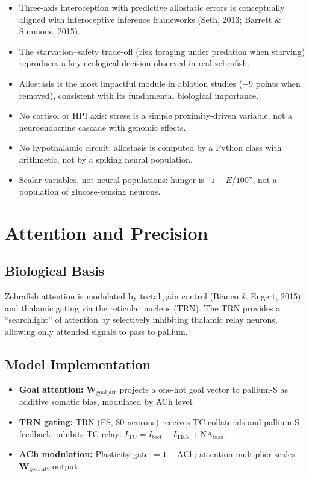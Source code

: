 \documentclass[11pt,a4paper]{article}
\begin{document}
\begin{itemize}[leftmargin=*]
\item[\textcolor{realistic}{$\checkmark$}] Three-axis interoception with predictive
  allostatic errors is conceptually aligned with interoceptive inference frameworks
  (Seth, 2013; Barrett \& Simmons, 2015).
\item[\textcolor{realistic}{$\checkmark$}] The starvation--safety trade-off
  (risk foraging under predation when starving) reproduces a key ecological
  decision observed in real zebrafish.
\item[\textcolor{realistic}{$\checkmark$}] Allostasis is the most impactful module
  in ablation studies ($-9$ points when removed), consistent with its fundamental
  biological importance.
\item[\textcolor{missing}{$\times$}] No cortisol or HPI axis: stress is a simple
  proximity-driven variable, not a neuroendocrine cascade with genomic effects.
\item[\textcolor{missing}{$\times$}] No hypothalamic circuit: allostasis is computed
  by a Python class with arithmetic, not by a spiking neural population.
\item[\textcolor{missing}{$\times$}] Scalar variables, not neural populations:
  hunger is ``$1 - E/100$'', not a population of glucose-sensing neurons.
\end{itemize}

\section{Attention and Precision}
\label{sec:attention}

\subsection{Biological Basis}

Zebrafish attention is modulated by tectal gain control (Bianco \& Engert, 2015)
and thalamic gating via the reticular nucleus (TRN).  The TRN provides a
``searchlight'' of attention by selectively inhibiting thalamic relay neurons,
allowing only attended signals to pass to pallium.

\subsection{Model Implementation}

\begin{itemize}[leftmargin=*]
\item \textbf{Goal attention:} $\mathbf{W}_\text{goal\_att}$ projects a one-hot
  goal vector to pallium-S as additive somatic bias, modulated by ACh level.
\item \textbf{TRN gating:} TRN (FS, 80 neurons) receives TC collaterals and
  pallium-S feedback, inhibits TC relay: $I_\text{TC} = I_\text{tect} - I_\text{TRN} + \text{NA}_\text{bias}$.
\item \textbf{ACh modulation:} Plasticity gate $= 1 + \text{ACh}$; attention
  multiplier scales $\mathbf{W}_\text{goal\_att}$ output.
\end{itemize}
\end{document}
